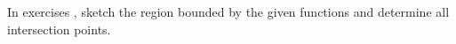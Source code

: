{\noindent In exercises}
{, sketch the region bounded by the given functions and determine all intersection points. }
